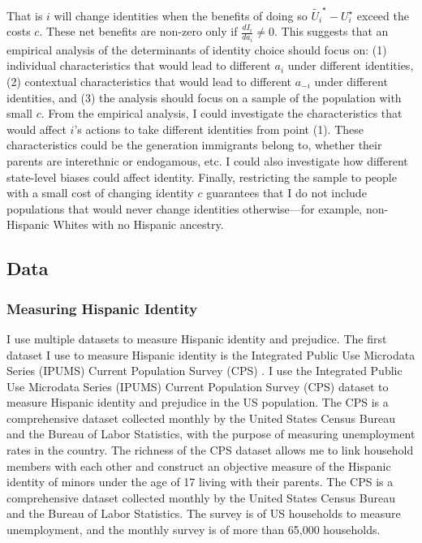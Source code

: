\documentclass[12pt, fullpage]{article}
\begin{document}
That is $i$ will change identities when the benefits of doing so $\tilde{U_{i}}^{\star} - U_{i}^{\star}$ exceed the costs $c$. These net benefits are non-zero only if $\frac{d I_i}{d a_i} \neq 0$. This suggests that an empirical analysis of the determinants of identity choice should focus on: (1) individual characteristics that would lead to different $a_i$ under different identities, (2) contextual characteristics that would lead to different $a_{-i}$ under different identities, and (3) the analysis should focus on a sample of the population with small $c$. From the empirical analysis, I could investigate the characteristics that would affect $i$'s actions to take different identities from point (1). These characteristics could be the generation immigrants belong to, whether their parents are interethnic or endogamous, etc. I could also investigate how different state-level biases could affect identity. Finally, restricting the sample to people with a small cost of changing identity $c$ guarantees that I do not include populations that would never change identities otherwise---for example, non-Hispanic Whites with no Hispanic ancestry.

\subsection{Data}\label{sec:data}

\subsubsection{Measuring Hispanic Identity}\label{subsec:cps}

I use multiple datasets to measure Hispanic identity and prejudice. The first dataset I use to measure Hispanic identity is the Integrated Public Use Microdata Series (IPUMS) Current Population Survey (CPS) \citep{floodsarahIntegratedPublicUse2021a}. I use the Integrated Public Use Microdata Series (IPUMS) Current Population Survey (CPS) dataset to measure Hispanic identity and prejudice in the US population. The CPS is a comprehensive dataset collected monthly by the United States Census Bureau and the Bureau of Labor Statistics, with the purpose of measuring unemployment rates in the country. The richness of the CPS dataset allows me to link household members with each other and construct an objective measure of the Hispanic identity of minors under the age of 17 living with their parents. The CPS is a comprehensive dataset collected monthly by the United States Census Bureau and the Bureau of Labor Statistics. \linebreak The survey is of US households to measure unemployment, and the monthly survey is of more than 65,000 households. 
\end{document}
